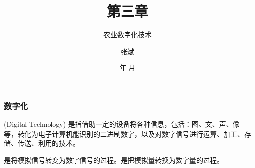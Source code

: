 \documentclass[dvipsnames, svgnames, x11names]{beamer}
\title{第三章}
\subtitle{农业数字化技术}
\author{张斌}
\institute[理工系]{河北农业大学 理工系}
\date{\the\year 年 \the\month 月}
\begin{document}
  
\begin{frame}
  \titlepage
  \thispagestyle{empty}
  \addtocounter{framenumber}{-1}
\end{frame}

\begin{frame}
    \frametitle{数字化}
     (Digital Technology) 是指借助一定的设备将各种信息，包括：图、文、声、像等，转化为电子计算机能识别的二进制数字，以及对数字信号进行运算、加工、存储、传送、利用的技术。
  \bigskip

  是将模拟信号转变为数字信号的过程。是把模拟量转换为数字量的过程。

\end{frame}

\begin{frame}{}
  \begin{center}
      {\Huge {}}
  \end{center}
  \tableofcontents[subsectionstyle=hide/hide/show]
  \thispagestyle{empty}
  \addtocounter{framenumber}{-1}
\end{frame}





\end{document}
